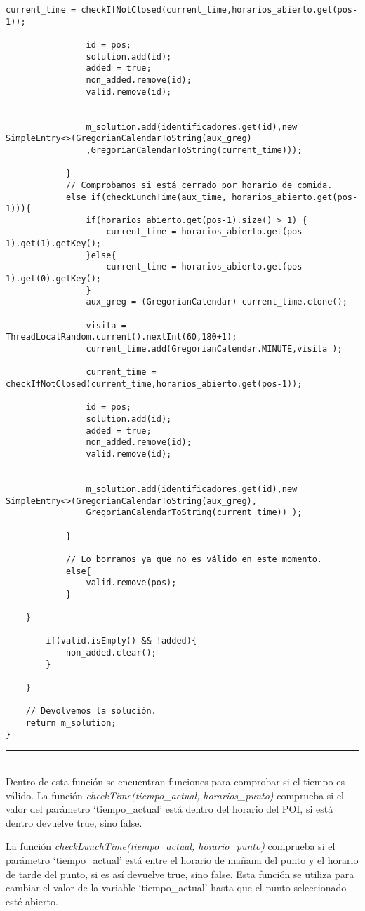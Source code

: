 \begin{lstlisting}[caption=Función para encontrar la ruta entre los puntos seleccionados.]
				current_time = checkIfNotClosed(current_time,horarios_abierto.get(pos-1));
				
				id = pos;
				solution.add(id);
				added = true;
				non_added.remove(id);
				valid.remove(id);
				
				
				m_solution.add(identificadores.get(id),new SimpleEntry<>(GregorianCalendarToString(aux_greg)
				,GregorianCalendarToString(current_time)));
						
			} 
			// Comprobamos si está cerrado por horario de comida.
			else if(checkLunchTime(aux_time, horarios_abierto.get(pos-1))){
				if(horarios_abierto.get(pos-1).size() > 1) {
					current_time = horarios_abierto.get(pos - 1).get(1).getKey();
				}else{ 
					current_time = horarios_abierto.get(pos-1).get(0).getKey();
				}
				aux_greg = (GregorianCalendar) current_time.clone();
				
				visita = ThreadLocalRandom.current().nextInt(60,180+1);
				current_time.add(GregorianCalendar.MINUTE,visita );
				
				current_time = checkIfNotClosed(current_time,horarios_abierto.get(pos-1));
				
				id = pos;
				solution.add(id);
				added = true;
				non_added.remove(id);
				valid.remove(id);
				
				
				m_solution.add(identificadores.get(id),new SimpleEntry<>(GregorianCalendarToString(aux_greg),
				GregorianCalendarToString(current_time)) );
			
			}
			
			// Lo borramos ya que no es válido en este momento.
			else{
				valid.remove(pos);
			}
		
	}
	
		if(valid.isEmpty() && !added){
			non_added.clear();
		}
	
	}
	
	// Devolvemos la solución.
	return m_solution;
}
\end{lstlisting}
\noindent\rule[-1ex]{\textwidth}{1pt}\\

Dentro de esta función se encuentran funciones para comprobar si el tiempo es válido. La función \textit{checkTime(tiempo\_actual, horarios\_punto)} comprueba si el valor del parámetro \enquote*{tiempo\_actual} está dentro del horario del POI, si está dentro devuelve true, sino false.\newline

La función \textit{checkLunchTime(tiempo\_actual, horario\_punto)} comprueba si el parámetro \enquote*{tiempo\_actual} está entre el horario de mañana del punto y el horario de tarde del punto, si es así devuelve true, sino false. Esta función se utiliza para cambiar el valor de la variable \enquote*{tiempo\_actual} hasta que el punto seleccionado esté abierto.

